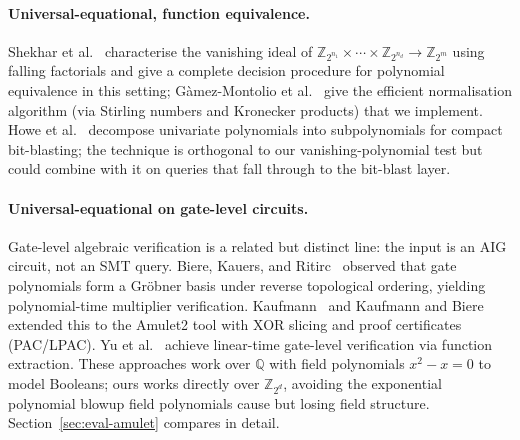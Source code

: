 \documentclass[runningheads]{llncs}
\begin{document}
\paragraph{Universal-equational, function equivalence.}
Shekhar et al.~\cite{shekhar2007equivalence} characterise the
vanishing ideal of $\mathbb{Z}_{2^{n_1}} \times \cdots \times
\mathbb{Z}_{2^{n_d}} \to \mathbb{Z}_{2^m}$ using falling
factorials and give a complete decision procedure for polynomial
equivalence in this setting; G\`amez-Montolio
et al.~\cite{gamez2024efficient} give the efficient normalisation
algorithm (via Stirling numbers and Kronecker products) that we
implement. Howe et al.~\cite{howe2025subpolynomial} decompose
univariate polynomials into subpolynomials for compact
bit-blasting; the technique is orthogonal to our
vanishing-polynomial test but could combine with it on queries
that fall through to the bit-blast layer.

\paragraph{Universal-equational on gate-level circuits.}
Gate-level algebraic verification is a related but distinct line:
the input is an AIG circuit, not an SMT query. Biere, Kauers, and
Ritirc~\cite{biere2017challenges} observed that gate polynomials
form a Gr\"obner basis under reverse topological ordering,
yielding polynomial-time multiplier verification.
Kaufmann~\cite{kaufmann2020thesis} and Kaufmann and
Biere~\cite{kaufmann2021amulet} extended this to the Amulet2 tool
with XOR slicing and proof certificates (PAC/LPAC).
Yu et al.~\cite{yu2016arithmetic} achieve linear-time gate-level
verification via function extraction. These approaches work over
$\mathbb{Q}$ with field polynomials $x^2 - x = 0$ to model
Booleans; ours works directly over $\mathbb{Z}_{2^d}$, avoiding
the exponential polynomial blowup field polynomials cause but
losing field structure. Section~\ref{sec:eval-amulet} compares
in detail.
\end{document}
